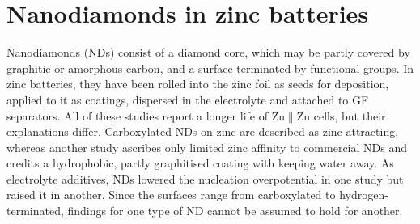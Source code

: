 \section{Nanodiamonds in zinc batteries}
\label{sec:nanodiamonds}

Nanodiamonds (NDs) consist of a diamond core, which may be partly covered by graphitic or amorphous carbon, and a surface terminated by functional groups\cite{mochalin_properties_2011}.
In zinc batteries, they have been rolled into the zinc foil as seeds for deposition\cite{wang_nanodiamond_2024,wang_meiling_2024}, applied to it as coatings\cite{liu_multifunctional_2024,chen_coupling_2024}, dispersed in the electrolyte\cite{ding_bioinspired_2025,zhu_nanodiamond_2026} and attached to GF separators\cite{zhang_modulating_2024}.
All of these studies report a longer life of Zn$\|$Zn cells, but their explanations differ.
Carboxylated NDs on zinc are described as zinc-attracting\cite{wang_nanodiamond_2024,wang_meiling_2024}, whereas another study ascribes only limited zinc affinity to commercial NDs and credits a hydrophobic, partly graphitised coating with keeping water away\cite{chen_coupling_2024}.
As electrolyte additives, NDs lowered the nucleation overpotential in one study\cite{zhu_nanodiamond_2026} but raised it in another\cite{ding_bioinspired_2025}.
Since the surfaces range from carboxylated\cite{wang_nanodiamond_2024} to hydrogen-terminated\cite{liu_multifunctional_2024}, findings for one type of ND cannot be assumed to hold for another.

